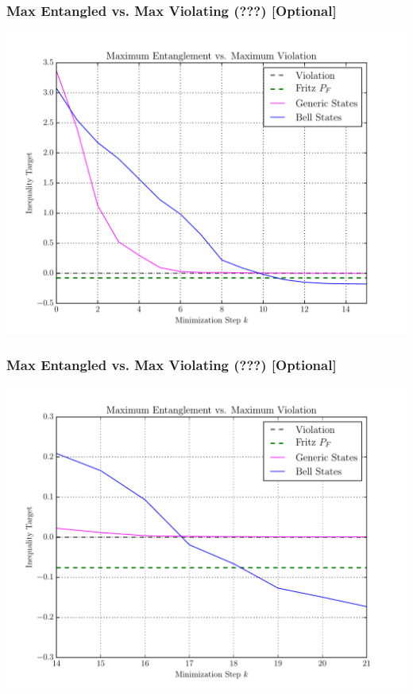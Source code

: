 \documentclass[
    hyperref={bookmarks=false},%
    xcolor={dvipsnames},
]{beamer}
\begin{document}
\begin{frame}
    \frametitle{Max Entangled vs. Max Violating (???) [Optional]}
    \includegraphics[width=\linewidth]{../../figures/optimizations/Max_Entanglement_vs_Max_Violation_random_seed.pdf}
\end{frame}

\begin{frame}
    \frametitle{Max Entangled vs. Max Violating (???) [Optional]}
    \includegraphics[width=\linewidth]{../../figures/optimizations/Max_Entanglement_vs_Max_Violation_random_seed_Zoomed.pdf}
\end{frame}
\end{document}

